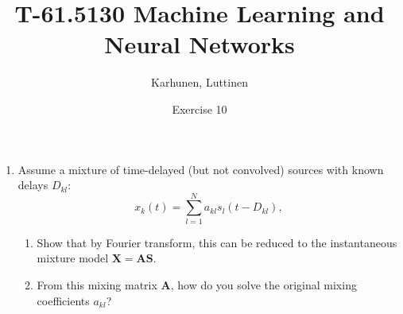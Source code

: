 
\title{T-61.5130 Machine Learning and Neural Networks}
\author{Karhunen, Luttinen}
\date{Exercise 10}

\usepackage{cancel}

\newcommand{\vect}[1]{{\bf{#1}}}
\newcommand{\svect}[1]{\boldsymbol{#1}}
\newcommand{\matr}[1]{\boldsymbol{#1}}




\maketitle
\thispagestyle{empty}

\begin{enumerate}


\item Assume a mixture of time-delayed (but not convolved) sources with known delays $D_{kl}$:
  \begin{displaymath}
    x_k(t) = \sum_{l=1}^N a_{kl}s_l(t-D_{kl}),
  \end{displaymath}
  \begin{enumerate}
  \item Show that by Fourier transform, this can be reduced to the instantaneous mixture
    model $\mathbf{X} = \mathbf{A} \mathbf{S}$.
  \item From this mixing matrix $\mathbf{A}$, how do you solve the original mixing
    coefficients $a_{kl}$?
  \end{enumerate}

  \begin{solution}



\end{solution}
\end{enumerate}

